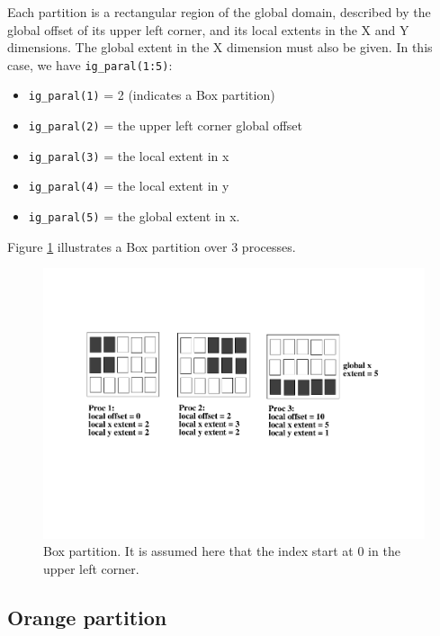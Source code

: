 Each partition is a rectangular region of the global domain, described
by the global offset of its upper left corner, and its local extents in the
X and Y dimensions. The global extent in the X dimension must also be
given. In this case, we have {\tt ig\_paral(1:5)}:
\begin{itemize}
 \item {\tt ig\_paral(1)} = 2 (indicates a Box partition)
 \item {\tt ig\_paral(2)} = the upper left corner global offset
 \item {\tt ig\_paral(3)} = the local extent in x
 \item {\tt ig\_paral(4)} = the local extent in y
 \item {\tt ig\_paral(5)} = the global extent in x.
\end{itemize}

Figure \ref{box_partition} illustrates a Box partition over 3
processes.  
 
\begin{figure}
\includegraphics[scale=.6]{figures/box_new} 
\caption{Box partition. It is assumed here that the index start at 0 in the upper left corner.}
\label{box_partition}
\end{figure} 
  
\subsection{Orange partition}

